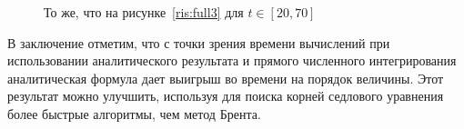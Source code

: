 \documentclass[14pt, a4paper]{article}
\numberwithin{figure}{section}
\numberwithin{equation}{section}
\newcommand{\sectionbreak}{\clearpage}
\begin{document}
\begin{figure}[h]
	\caption{То же, что на рисунке~\ref{ris:full3} для $t\in[20, 70]$}
	\label{ris:end3}
\end{figure}

В заключение отметим, что с точки зрения времени вычислений при использовании аналитического результата и прямого численного интегрирования аналитическая формула дает выигрыш во времени на порядок величины. Этот результат можно улучшить, используя для поиска корней седлового уравнения более быстрые алгоритмы, чем метод Брента.

\sectionbreak
\section*{}
\end{document}
